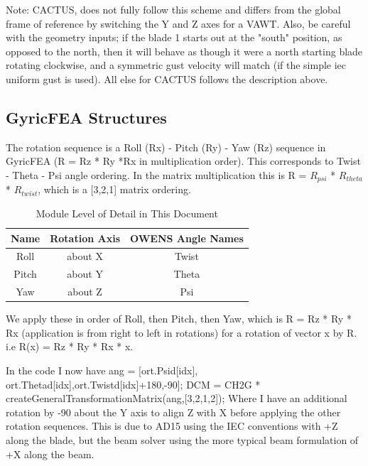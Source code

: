 \documentclass[11pt]{article}
\begin{document}
Note: CACTUS, does not fully follow this scheme and differs from the global frame of reference by switching the Y and Z axes for a VAWT.  Also, be careful with the geometry inputs; if the blade 1 starts out at the "south" position, as opposed to the north, then it will behave as though it were a north starting blade rotating clockwise, and a symmetric gust velocity will match (if the simple iec uniform gust is used).  All else for CACTUS follows the description above.

\subsection{GyricFEA Structures}

The rotation sequence is a Roll (Rx) - Pitch (Ry) - Yaw (Rz) sequence in GyricFEA (R = Rz * Ry *Rx in multiplication order). This corresponds to Twist - Theta - Psi angle ordering.  In the matrix multiplication this is R = $R_{psi}$ * $R_{theta}$ * $R_{twist}$, which is a [3,2,1] matrix ordering.
 
\begin{table}[htbp!]
\begin{center}
\caption{Module Level of Detail in This Document}
\begin{tabular}{| c | c | c |}
\hline
Name         &           Rotation Axis       &               OWENS Angle Names\\
\hline
Roll           &              about X          &                       Twist\\
Pitch              &        about Y            &                     Theta\\
Yaw               &         about Z                &                 Psi\\
\hline
\end{tabular}
\end{center}
\end{table}
 

 
We apply these in order of Roll, then Pitch, then Yaw, which is R = Rz * Ry * Rx    (application is from right to left in rotations) for a rotation of vector x by R.  i.e  R(x)  = Rz * Ry * Rx * x.
 
In the code I now have
ang = [ort.Psid[idx], ort.Thetad[idx],ort.Twistd[idx]+180,-90];
DCM = CH2G * createGeneralTransformationMatrix(ang,[3,2,1,2]);
Where I have an additional rotation by -90 about the Y axis to align Z with X before applying the other rotation sequences.  This is due to AD15 using the IEC conventions with +Z along the blade, but the beam solver using the more typical beam formulation of +X along the beam.
 
\end{document}
